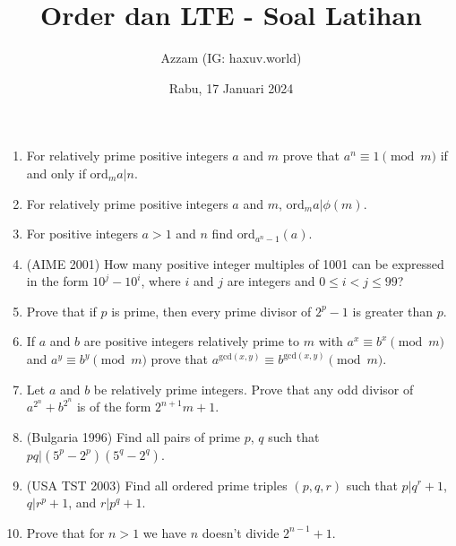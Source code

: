 \documentclass[12pt]{scrartcl}
\title{Order dan LTE - Soal Latihan}
\author{Azzam (IG: haxuv.world)}
\date{Rabu, 17 Januari 2024}
\begin{document}
\maketitle

\renewcommand*\contentsname{Daftar Isi}
\tableofcontents

\newpage
\begin{enumerate}
    \item For relatively prime positive integers $a$ and $m$ prove that $a^n \equiv 1 \pmod{m}$ if and only if $\text{ord}_m a | n$.

    \item For relatively prime positive integers $a$ and $m$, $\text{ord}_m a | \phi(m)$.
    
    \item For positive integers $a > 1$ and $n$ find $\text{ord}_{a^n-1} (a)$.
    
    \item (AIME 2001) How many positive integer multiples of 1001 can be expressed in the form $10^j-10^i$, where $i$ and $j$ are integers and $0 \leq i < j \leq 99$?
    
    \item Prove that if $p$ is prime, then every prime divisor of $2^p-1$ is greater than $p$.
    
    
    \item If $a$ and $b$ are positive integers relatively prime to $m$ with $a^x \equiv b^x \pmod{m}$ and $a^y \equiv b^y \pmod{m}$ prove that $a^{\text{gcd}(x,y)} \equiv b^{\text{gcd}(x,y)} \pmod{m}$.
    
    \item Let $a$ and $b$ be relatively prime integers. Prove that any odd divisor of $a^{2^n}+b^{2^n}$ is of the form $2^{n+1}m +1$.
    
    \item (Bulgaria 1996) Find all pairs of prime $p$, $q$ such that $pq | (5^p - 2^p) (5^q - 2^q)$.
    
    \item (USA TST 2003) Find all ordered prime triples $(p, q, r)$ such that $p | q^r + 1$, $q | r^p + 1$, and $r | p^q + 1$.
    
    \item Prove that for $n > 1$ we have $n$ doesn't divide $2^{n-1} + 1$.
    

\end{enumerate}
\end{document}
